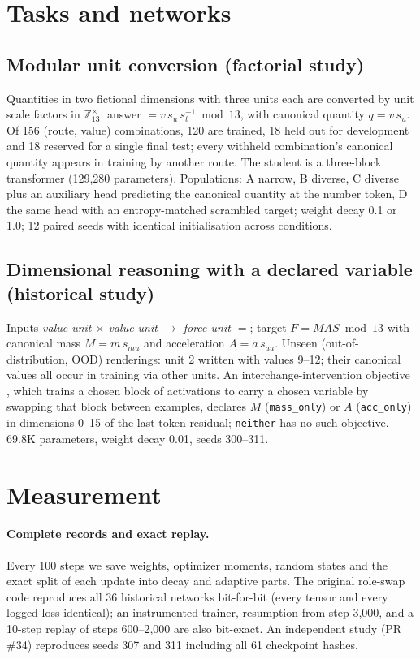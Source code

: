 \documentclass[11pt]{article}
\begin{document}
\section{Tasks and networks}
\subsection{Modular unit conversion (factorial study)}
Quantities in two fictional dimensions with three units each are converted by unit scale factors in
$\mathbb{Z}_{13}^{\times}$: answer $= v\,s_u\,s_t^{-1} \bmod 13$, with canonical quantity $q=v\,s_u$. Of 156
(route, value) combinations, 120 are trained, 18 held out for development and 18 reserved for a single final test;
every withheld combination's canonical quantity appears in training by another route. The student is a three-block
transformer (129,280 parameters). Populations: A narrow, B diverse, C diverse plus an auxiliary head predicting the
canonical quantity at the number token, D the same head with an entropy-matched scrambled target; weight decay 0.1
or 1.0; 12 paired seeds with identical initialisation across conditions.

\subsection{Dimensional reasoning with a declared variable (historical study)}
Inputs \emph{value unit $\times$ value unit $\to$ force-unit $=$}; target $F = M A S \bmod 13$ with canonical mass
$M=m\,s_{mu}$ and acceleration $A=a\,s_{au}$. Unseen (out-of-distribution, OOD) renderings: unit 2 written with
values 9--12; their canonical values all occur in training via other units. An interchange-intervention objective
\citep{geiger2022iit}, which trains a chosen block of activations to carry a chosen variable by swapping that block
between examples, declares $M$ (\texttt{mass\_only}) or $A$ (\texttt{acc\_only}) in dimensions 0--15 of the
last-token residual; \texttt{neither} has no such objective. 69.8K parameters, weight decay 0.01, seeds 300--311.

\section{Measurement}
\paragraph{Complete records and exact replay.} Every 100 steps we save weights, optimizer moments, random states and
the exact split of each update into decay and adaptive parts. The original role-swap code reproduces all 36
historical networks bit-for-bit (every tensor and every logged loss identical); an instrumented trainer, resumption
from step 3,000, and a 10-step replay of steps 600--2,000 are also bit-exact. An independent study (PR \#34)
reproduces seeds 307 and 311 including all 61 checkpoint hashes.
\end{document}
